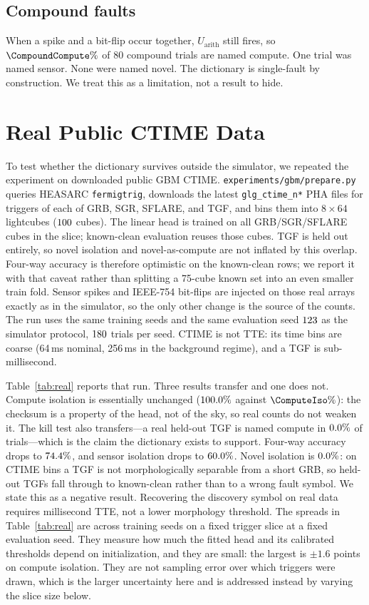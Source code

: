 \documentclass{ieeeaccess}
\begin{document}
\subsection{Compound faults}
When a spike and a bit-flip occur together, $U_{\mathrm{arith}}$ still fires, so $\CompoundCompute\%$ of $80$ compound trials are named compute. One trial was named sensor. None were named novel. The dictionary is single-fault by construction. We treat this as a limitation, not a result to hide.

\section{Real Public CTIME Data}
\label{sec:real}

To test whether the dictionary survives outside the simulator, we repeated the experiment on downloaded public GBM CTIME. \texttt{experiments/gbm/prepare.py} queries HEASARC \texttt{fermigtrig}, downloads the latest \texttt{glg\_ctime\_n*} PHA files for \RealPerClass{} triggers of each of GRB, SGR, SFLARE, and TGF, and bins them into $8\times64$ lightcubes ($100{}$ cubes). The linear head is trained on all GRB/SGR/SFLARE cubes in the slice; known-clean evaluation reuses those cubes. TGF is held out entirely, so novel isolation and novel-as-compute are not inflated by this overlap. Four-way accuracy is therefore optimistic on the known-clean rows; we report it with that caveat rather than splitting a 75-cube known set into an even smaller train fold. Sensor spikes and IEEE-754 bit-flips are injected on those real arrays exactly as in the simulator, so the only other change is the source of the counts. The run uses the same \RealSeeds{} training seeds and the same evaluation seed $123$ as the simulator protocol, $180{}$ trials per seed. CTIME is not TTE: its time bins are coarse (64\,ms nominal, 256\,ms in the background regime), and a TGF is sub-millisecond.

Table~\ref{tab:real} reports that run. Three results transfer and one does not. Compute isolation is essentially unchanged ($100.0\%$ against $\ComputeIso\%$): the checksum is a property of the head, not of the sky, so real counts do not weaken it. The kill test also transfers---a real held-out TGF is named compute in $0.0\%$ of trials---which is the claim the dictionary exists to support. Four-way accuracy drops to $74.4\%$, and sensor isolation drops to $60.0\%$. Novel isolation is $0.0\%$: on CTIME bins a TGF is not morphologically separable from a short GRB, so held-out TGFs fall through to known-clean rather than to a wrong fault symbol. We state this as a negative result. Recovering the discovery symbol on real data requires millisecond TTE, not a lower morphology threshold. The spreads in Table~\ref{tab:real} are across training seeds on a fixed trigger slice at a fixed evaluation seed. They measure how much the fitted head and its calibrated thresholds depend on initialization, and they are small: the largest is $\pm1.6$ points on compute isolation. They are not sampling error over which triggers were drawn, which is the larger uncertainty here and is addressed instead by varying the slice size below.
\end{document}
